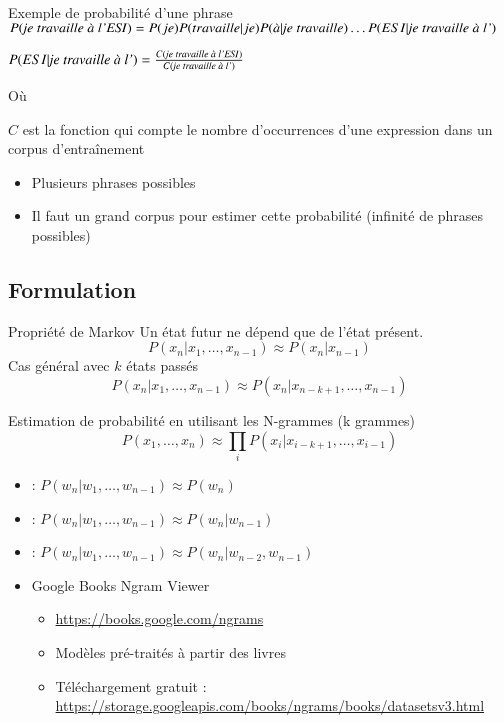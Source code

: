 \documentclass{KodeBook}
\begin{document}
\begin{exampleblock}{Exemple de probabilité d'une phrase}
	$ P(\text{\textit{je travaille à l'ESI}}) =  P(je) P(travaille | je) P(\text{\textit{à}} | \text{\textit{je travaille}}) \ldots P(ESI | \text{\textit{je travaille à l'}})$
	
	$P(ESI | \text{\textit{je travaille à l'}}) = \frac{C(\text{\textit{je travaille à l'ESI}})}{C( \text{\textit{je travaille à l'}})}$ 
	
	Où 
	
	$C$ est la fonction qui compte le nombre d'occurrences d'une expression dans un corpus d'entraînement
\end{exampleblock}

\begin{itemize}
	\item Plusieurs phrases possibles
	\item Il faut un grand corpus pour estimer cette probabilité (infinité de phrases possibles)
\end{itemize}

\subsection{Formulation}

\begin{block}{Propriété de Markov}
	Un état futur ne dépend que de l'état présent. 
	\[%
	P(x_n | x_1,\ldots, x_{n-1}) \approx P(x_n | x_{n-1})
	\]
	Cas général avec $k$ états passés 
	\[%
	P(x_n | x_1,\ldots, x_{n-1}) \approx P(x_n | x_{n-k+1}, \ldots, x_{n-1})
	\]
\end{block}

\begin{block}{Estimation de probabilité en utilisant les N-grammes (k grammes)}
	\[
	P(x_1,\ldots, x_{n}) \approx \prod_i P(x_i | x_{i-k+1}, \ldots, x_{i-1})
	\]
\end{block}

\begin{itemize}
	\item {} : $P(w_n | w_1,\ldots, w_{n-1}) \approx P(w_n)$
	\item {} : $P(w_n | w_1,\ldots, w_{n-1}) \approx P(w_n | w_{n-1})$
	\item {} :  $P(w_n | w_1,\ldots, w_{n-1}) \approx P(w_n | w_{n-2}, w_{n-1})$
	\item Google Books Ngram Viewer
	\begin{itemize}
		\item \url{https://books.google.com/ngrams}
		\item Modèles pré-traités à partir des livres 
		\item Téléchargement gratuit : \url{https://storage.googleapis.com/books/ngrams/books/datasetsv3.html}
	\end{itemize}
\end{itemize}
\end{document}
